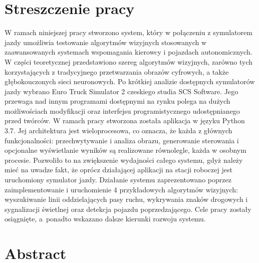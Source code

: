 \section*{Streszczenie pracy}


W ramach niniejszej pracy stworzono system, który w połączeniu z symulatorem jazdy umożliwia testowanie algorytmów wizyjnych stosowanych w zaawansowanych systemach wspomagania kierowcy i pojazdach autonomicznych.
W części teoretycznej przedstawiono szereg algorytmów wizyjnych, zarówno tych korzystających z tradycyjnego przetwarzania obrazów cyfrowych, a także głębokouczonych sieci neuronowych.
Po krótkiej analizie dostępnych symulatorów jazdy wybrano Euro Truck Simulator 2 czeskiego studia SCS Software.
Jego przewaga nad innym programami dostępnymi na rynku polega na dużych możliwościach modyfikacji oraz interfejsu programistycznego udostępnianego przed twórców.
W ramach pracy stworzona została aplikacja w języku Python 3.7.
Jej architektura jest wieloprocesowa, co oznacza, że każda z głównych funkcjonalności: przechwytywanie i analiza obrazu, generowanie 
sterowania i opcjonalne wyświetlanie wyników są realizowane równolegle, każda w osobnym procesie.
Pozwoliło to na zwiększenie wydajności całego systemu, gdyż należy mieć na uwadze fakt, że oprócz działającej aplikacji na stacji roboczej jest uruchomiony symulator jazdy.
Działanie systemu zaprezentowano poprzez zaimplementowanie i uruchomienie 4 przykładowych algorytmów wizyjnych: wyszukiwanie linii oddzielających pasy ruchu, wykrywania znaków drogowych i sygnalizacji świetlnej oraz detekcja pojazdu poprzedzającego.
Cele pracy zostały osiągnięte, a~ponadto wskazano dalsze kierunki rozwoju systemu.



\section*{Abstract}

